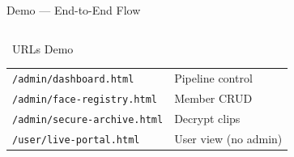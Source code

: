 \documentclass[aspectratio=169, 12pt]{beamer}
\begin{document}
\begin{frame}{Demo --- End-to-End Flow}
\begin{columns}[c]
\begin{alertblock}{\faExclamationCircle\ URLs Demo}
\footnotesize
\begin{tabular}{ll}
\texttt{/admin/dashboard.html} & Pipeline control \\
\texttt{/admin/face-registry.html} & Member CRUD \\
\texttt{/admin/secure-archive.html} & Decrypt clips \\
\texttt{/user/live-portal.html} & User view (no admin) \\
\end{tabular}
\end{alertblock}
\end{columns}
\end{frame}

\end{document}
